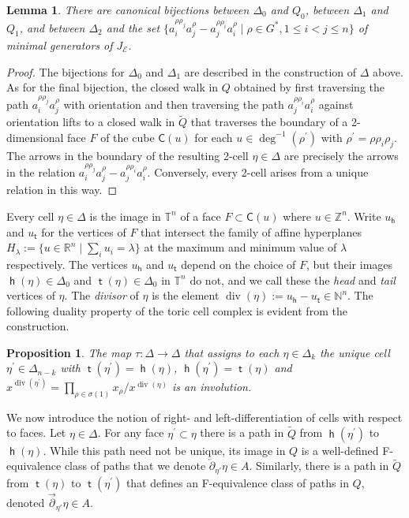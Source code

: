 \documentclass[11pt,a4paper]{amsart}
\numberwithin{equation}{section}
\newtheorem{proposition}[theorem]{Proposition}
\newtheorem{lemma}[theorem]{Lemma}
\theoremstyle{definition}
\theoremstyle{remark}
\newcommand{\NN}{\ensuremath{\mathbb{N}}}
\newcommand{\RR}{\ensuremath{\mathbb{R}}}
\newcommand{\ZZ}{\ensuremath{\mathbb{Z}}}
\renewcommand{\div}{\operatorname{div}}
\newcommand{\head}{\operatorname{\mathsf{h}}}
\newcommand{\tail}{\operatorname{\mathsf{t}}}
\begin{document}
 \begin{lemma}
 \label{lem:McKaybijections}
There are canonical bijections between $\Delta_0$ and $Q_0$, between $\Delta_1$ and $Q_1$, and between $\Delta_2$ and the set $\{a_i^{\rho \rho_j}a_j^{\rho}-a_j^{\rho \rho_i}a_i^{\rho} \mid \rho \in G^{*}, 1 \leq i<j \leq n\}$ of minimal generators of $J_\mathscr{E}$. 
\end{lemma}
\begin{proof}
The bijections for $\Delta_0$ and $\Delta_1$ are described in the construction of $\Delta$ above.  As for the final bijection, the
closed walk in $Q$ obtained by first traversing the path $a_i^{\rho \rho_j}a_j^{\rho}$ with orientation and then traversing the path $a_j^{\rho \rho_i}a_i^{\rho}$ against orientation lifts to a closed walk in $\widetilde{Q}$ that traverses the boundary of a 2-dimensional face $F$ of the cube $\mathsf{C}(u)$ for each $u\in \deg^{-1}(\rho^\prime)$ with $\rho^\prime = \rho\rho_i\rho_j$. The arrows in the boundary of the resulting 2-cell $\eta\in \Delta$ are precisely the arrows in the relation $a_i^{\rho \rho_j}a_j^{\rho}-a_j^{\rho \rho_i}a_i^{\rho}$. Conversely, every 2-cell arises from a unique relation in this way.
\end{proof}

Every cell $\eta\in\Delta$ is the image in $\mathbb{T}^n$ of a face $F\subset\mathsf{C}(u)$ where $u\in \ZZ^n$. Write $u_{\head}$ and $u_{\tail}$ for the vertices of $F$ that intersect the family of affine hyperplanes $H_\lambda:= \{u\in \RR^n \mid \sum_i u_i=\lambda\}$ at the maximum and minimum value of $\lambda$ respectively. The vertices $u_{\head}$ and $u_{\tail}$ depend on the choice of $F$, but their images $\head(\eta)\in \Delta_0$ and $\tail(\eta)\in\Delta_0$ in $\mathbb{T}^n$ do not, and we call these the \emph{head} and \emph{tail} vertices of $\eta$. The \emph{divisor} of $\eta$ is the element $\div(\eta):=u_{\head}-u_{\tail}\in \NN^n$. The following duality property of the toric cell complex is evident from the construction.

\begin{proposition}
\label{prop:dualityMcKay}
The map $\tau\colon \Delta\to \Delta$ that assigns to each $\eta\in \Delta_k$ the unique cell $\eta^\prime\in \Delta_{n-k}$ with $\tail(\eta^\prime)=\head(\eta)$, $\head(\eta^\prime)=\tail(\eta)$ and $x^{\div(\eta^\prime)} = \prod_{\rho\in \sigma(1)}x_\rho/x^{\div(\eta)}$ is an involution.
\end{proposition}

We now introduce the notion of right- and left-differentiation of cells with respect to faces. Let $\eta\in \Delta$. For any face $\eta^\prime\subset \eta$ there is a path in $\widetilde{Q}$ from $\head(\eta^\prime)$ to $\head(\eta)$. While this path need not be unique, its image in $Q$ is a well-defined F-equivalence class of paths that we denote $\overleftarrow{\partial}_{\!\eta'}\eta\in A$. Similarly, there is a path in $\widetilde{Q}$ from $\tail(\eta)$ to $\tail(\eta^\prime)$ that defines an F-equivalence class of paths in $Q$, denoted $\overrightarrow{\partial}_{\!\eta'}\eta\in A$.
\end{document}
